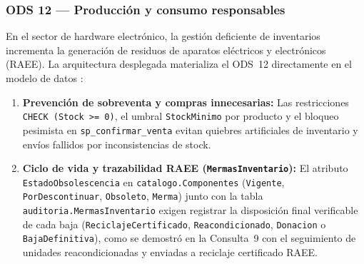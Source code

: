 \subsubsection{ODS 12 --- Producci\'on y consumo responsables}

En el sector de hardware electr\'onico, la gesti\'on deficiente de inventarios incrementa la generaci\'on de residuos de aparatos el\'ectricos y electr\'onicos (RAEE).
La arquitectura desplegada materializa el ODS~12 directamente en el modelo de datos \citep{ods12_2015}:

\begin{enumerate}
  \item \textbf{Prevenci\'on de sobreventa y compras innecesarias:} Las restricciones \texttt{CHECK (Stock >= 0)}, el umbral \texttt{StockMinimo} por producto y el bloqueo pesimista en \texttt{sp\_confirmar\_venta} evitan quiebres artificiales de inventario y env\'ios fallidos por inconsistencias de stock.
  \item \textbf{Ciclo de vida y trazabilidad RAEE (\texttt{MermasInventario}):} El atributo \texttt{EstadoObsolescencia} en \texttt{catalogo.Componentes} (\texttt{Vigente}, \texttt{PorDescontinuar}, \texttt{Obsoleto}, \texttt{Merma}) junto con la tabla \texttt{auditoria.MermasInventario} exigen registrar la disposici\'on final verificable de cada baja (\texttt{ReciclajeCertificado}, \texttt{Reacondicionado}, \texttt{Donacion} o \texttt{BajaDefinitiva}), como se demostr\'o en la Consulta~9 con el seguimiento de unidades reacondicionadas y enviadas a reciclaje certificado RAEE.
\end{enumerate}
